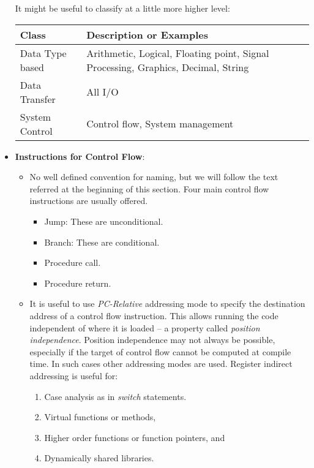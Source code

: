 \begin{itemize}
  It might be useful to classify at a little more higher level: 
  \begin{center}
    \begin{tabular}[h]{|l|l|}
      \hline
      \textbf{Class} & \textbf{Description or Examples} \\
      \hline
      Data Type based & Arithmetic, Logical, Floating point, Signal
                        Processing, Graphics, Decimal, String \\
      Data Transfer & All I/O \\
      System Control & Control flow, System management \\
      \hline
    \end{tabular}
  \end{center}
\item \textbf{Instructions for Control Flow}:\\
  \begin{itemize}
  \item No well defined convention for  naming, but we will follow the
    text referred at the beginning  of this section. Four main control
    flow instructions are usually offered.
    \begin{itemize}
    \item Jump: These are unconditional.
    \item Branch: These are conditional.
    \item Procedure call.
    \item Procedure return.
    \end{itemize}
  \item  It is  useful to  use \emph{PC-Relative}  addressing mode  to
    specify  the destination  address of  a control  flow instruction.
    This allows running the code independent  of where it is loaded --
    a   property   called  \emph{position   independence}.    Position
    independence may not always be  possible, especially if the target
    of control flow cannot be computed at compile time.  In such cases
    other addressing modes are  used.  Register indirect addressing is
    useful for:
    \begin{enumerate}
    \item Case analysis as in \emph{switch} statements.
    \item Virtual functions or methods,
    \item Higher order functions or function pointers, and
    \item Dynamically shared libraries.
    \end{enumerate}

\end{itemize}
\end{itemize}
